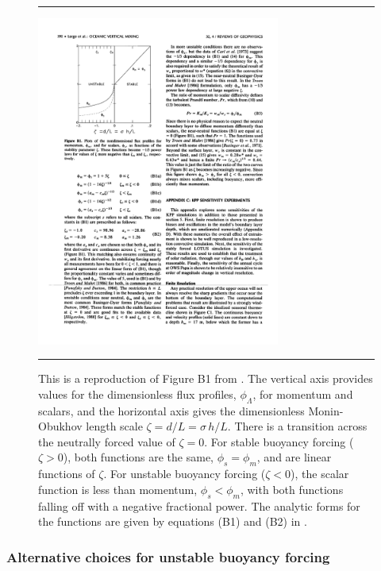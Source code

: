  
\begin{figure}[h!t]
\rule{\textwidth}{0.005in}
\begin{center}
\includegraphics[angle=0,width=8cm]{./figs/LargeKPP_figB1.pdf}
\caption[Figure B1 from \cite{LargeKPP}]{\sf This is a reproduction of
  Figure B1 from \cite{LargeKPP}.  The vertical axis provides values
  for the dimensionless flux profiles, $\phi_{\Lambda}$, for momentum
  and scalars, and the horizontal axis gives the dimensionless
  Monin-Obukhov length scale $\zeta = d/L = \sigma \, h/L$.  There is
  a transition across the neutrally forced value of $\zeta = 0$.  For
  stable buoyancy forcing ($\zeta > 0$), both functions are the same,
  $\phi_{s} = \phi_{m}$, and are linear functions of $\zeta$. For
  unstable buoyancy forcing ($\zeta < 0$), the scalar function is less
  than momentum, $\phi_{s} < \phi_{m}$, with both functions falling
  off with a negative fractional power.  The analytic forms for the
  functions are given by equations (B1) and (B2) in \cite{LargeKPP}.}
\label{fig:large-etal-figureB1}
\end{center}
\rule{\textwidth}{0.005in}
\end{figure}


\subsubsection{Alternative choices for unstable buoyancy forcing}


